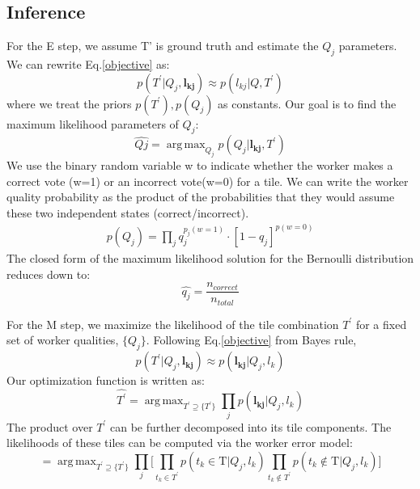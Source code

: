 \documentclass[letterpaper]{article} %
\DeclareMathOperator*{\argmax}{arg\,max}
\begin{document}
\subsection{Inference}
\par For the E step, we assume T' is ground truth and estimate the $Q_j$ parameters. We can rewrite Eq.\ref{objective} as: 
\begin{equation}
p(T^\prime| Q_j,\mathbf{l_{kj}})
\approx p(l_{kj}| Q,T^\prime)
\end{equation}
where we treat the priors $p(T^\prime),p(Q_j)$ as constants.
Our goal is to find the maximum likelihood parameters of $Q_j$: 
\begin{equation}
\hat{Qj} = \argmax_{Q_j} p(Q_j| \mathbf{l_{kj}},T^\prime)
\end{equation}
We use the binary random variable w to indicate whether the worker makes a correct vote (w=1) or an incorrect vote(w=0) for a tile. We can write the worker quality probability as the product of the probabilities that they would assume these two independent states (correct/incorrect). 
\begin{align}
p(Q_j) = \prod_j q_j^{p_j(w=1)}\cdot [1-q_j]^{p(w=0)}
\end{align}
The closed form of the maximum likelihood solution for the Bernoulli distribution reduces down to: 
\begin{equation}
\hat{q_j}=\frac{n_{correct}}{n_{total}}
\end{equation}
\par For the M step, we maximize the likelihood of the tile combination $T^\prime$ for a fixed set of worker qualities, $\{Q_j\}$. Following Eq.\ref{objective} from Bayes rule, 
\begin{equation}
p(T^\prime| Q_j,\mathbf{l_{kj}})
\approx p(\mathbf{l_{kj}}|Q_j,l_k)
\end{equation}
Our optimization function is written as:
\begin{equation}
\hat{T^\prime}=\argmax_{T^\prime\supseteq \{T^\prime\} } \prod_j p(\mathbf{l_{kj}}|Q_j,l_k)
\end{equation}
 The product over $T^\prime$ can be further decomposed into its tile components. The likelihoods of these tiles can be computed via the worker error model: 
\begin{equation}
=\argmax_{T^\prime\supseteq \{T^\prime\}} \prod_j\Bigg[\prod_{t_k\in T^\prime} p(t_k\in \mathrm{T}|Q_j,l_k)\prod_{t_k\notin T^\prime} p(t_k\notin \mathrm{T}|Q_j,l_k)\Bigg]
\end{equation}
% 
% 
\end{document}
